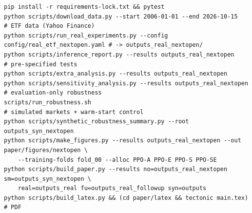 \documentclass[11pt]{article}
\begin{document}
{\scriptsize\begin{verbatim}
pip install -r requirements-lock.txt && pytest
python scripts/download_data.py --start 2006-01-01 --end 2026-10-15          # ETF data (Yahoo Finance)
python scripts/run_real_experiments.py --config config/real_etf_nextopen.yaml # -> outputs_real_nextopen/
python scripts/inference_report.py --results outputs_real_nextopen            # pre-specified tests
python scripts/extra_analysis.py --results outputs_real_nextopen
python scripts/sensitivity_analysis.py --results outputs_real_nextopen        # evaluation-only robustness
scripts/run_robustness.sh                                                     # simulated markets + warm-start control
python scripts/synthetic_robustness_summary.py --root outputs_syn_nextopen
python scripts/make_figures.py --results outputs_real_nextopen --out paper/figures/nextopen \
    --training-folds fold_00 --alloc PPO-A PPO-E PPO-S PPO-SE
python scripts/build_paper.py --results no=outputs_real_nextopen sm=outputs_syn_nextopen \
    real=outputs_real fu=outputs_real_followup syn=outputs
python scripts/build_latex.py && (cd paper/latex && tectonic main.tex)       # PDF
\end{verbatim}}
\end{document}
